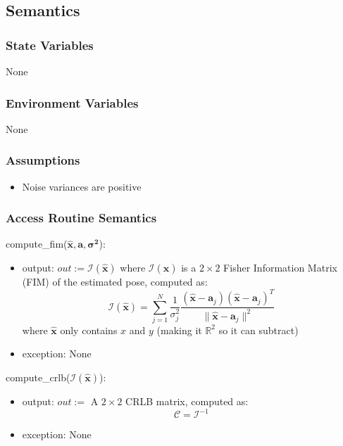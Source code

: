 \documentclass[12pt, titlepage]{article}
\begin{document}
\subsection{Semantics}

\subsubsection{State Variables}
None

\subsubsection{Environment Variables}
None

\subsubsection{Assumptions}
\begin{itemize}
  \item Noise variances are positive
\end{itemize}

\subsubsection{Access Routine Semantics}

\noindent compute\_fim($\hat{\mathbf{x}}, \mathbf{a}, \boldsymbol{\sigma^2}$):
\begin{itemize}
\item output: $out:=\boldsymbol{\mathcal{I}}(\hat{\mathbf{x}})$ where $\boldsymbol{\mathcal{I}}(\hat{\mathbf{x}})$ is a \( 2 \times 2 \) Fisher Information Matrix (FIM) of the estimated pose, computed as:
\[
\mathcal{I}(\hat{\mathbf{x}}) = \sum_{j=1}^{N} \frac{1}{\sigma_j^2} \frac{(\hat{\mathbf{x}} - \mathbf{a}_j)(\hat{\mathbf{x}} - \mathbf{a}_j)^T}{\|\hat{\mathbf{x}} - \mathbf{a}_j\|^2}
\]
where $\mathbf{\hat{x}}$ only contains $x$ and $y$ (making it $\mathbb{R}^2$ so it can subtract)
\item exception: None
\end{itemize}

\noindent compute\_crlb($\boldsymbol{\mathcal{I}}(\hat{\mathbf{x}})$):
\begin{itemize}
\item output: $out:=$ A \( 2 \times 2 \) CRLB matrix, computed as:
\[
\boldsymbol{\mathcal{C}} = \boldsymbol{\mathcal{I}}^{-1}
\]
\item exception: None
\end{itemize}
\end{document}
